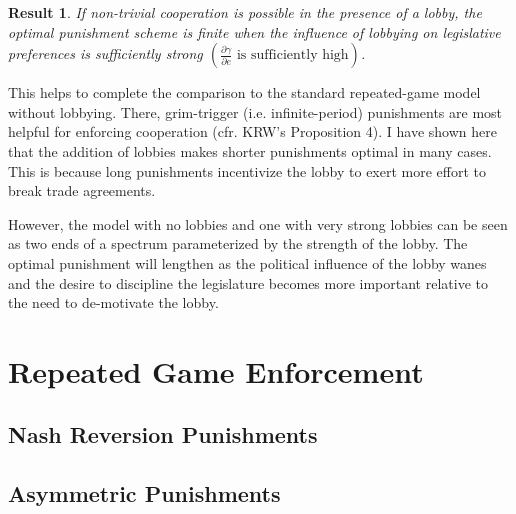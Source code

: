 \documentclass[authoryear, review]{elsarticle}
\newtheorem{result}{Result}
\newcommand{\ga}{\gamma}
\begin{document}
\begin{result}
  If non-trivial cooperation is possible in the presence of a lobby, the optimal punishment scheme is finite when the influence of lobbying on legislative preferences is sufficiently strong $\left(\frac{\partial \ga}{\partial e}\text{ is sufficiently high}\right)$.
\end{result}

This helps to complete the comparison to the standard repeated-game model without lobbying. There, grim-trigger (i.e. infinite-period) punishments are most helpful for enforcing cooperation (cfr. KRW's Proposition 4). I have shown here that the addition of lobbies makes shorter punishments optimal in many cases. This is because long punishments incentivize the lobby to exert more effort to break trade agreements.

However, the model with no lobbies and one with very strong lobbies can be seen as two ends of a spectrum parameterized by the strength of the lobby. The optimal punishment will lengthen as the political influence of the lobby wanes and the desire to discipline the legislature becomes more important relative to the need to de-motivate the lobby.







\section{Repeated Game Enforcement}
\label{sec:repeated2}

\subsection{Nash Reversion Punishments}
\label{sec:nashrev}

\subsection{Asymmetric Punishments}
\label{sec:asymmetric}
\end{document}
